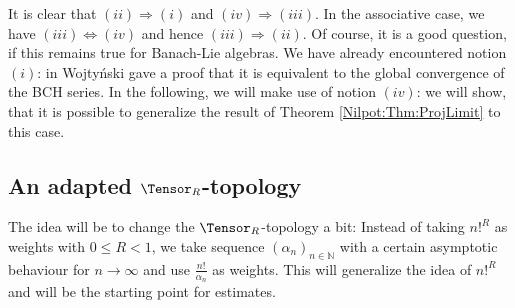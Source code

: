 It is clear that $(ii) \Rightarrow (i)$ and $(iv) \Rightarrow (iii)$. In the 
associative case, we have $(iii) \Leftrightarrow (iv)$ and hence $(iii) 
\Rightarrow (ii)$. Of course, it is a good question, if this remains true for 
Banach-Lie algebras. We have already encountered notion $(i)$: in 
\cite{wojtynski:1998a} Wojty\'nski gave a proof that it is equivalent to the 
global convergence of the BCH series. In the following, we will make use of notion 
$(iv)$: we will show, that it is possible to generalize the result of Theorem 
\ref{Nilpot:Thm:ProjLimit} to this case.



\subsection{An adapted $\Tensor_R$-topology}

The idea will be to change the $\Tensor_R$-topology a bit: Instead of taking 
$n!^R$ as weights with $0 \leq R < 1$, we take sequence $(\alpha_n)_{n \in 
\mathbb{N}}$ with a certain asymptotic 
behaviour for $n \longrightarrow \infty$ and use $\frac{n!}{\alpha_n}$ as 
weights. This will generalize the idea of $n!^R$ and will be the starting point 
for estimates.

